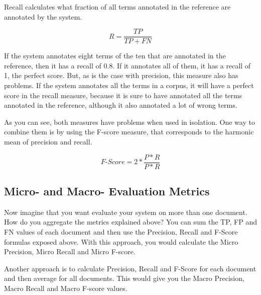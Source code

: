 Recall calculates what fraction of all terms annotated in the reference are annotated by the system.

\begin{equation}
R = \frac{TP}{TP+FN}
\end{equation}

If the system annotates eight terms of the ten that are annotated in the reference, then it has a recall of 0.8. If it annotates all of them, it has a recall of 1, the perfect score. But, as is the case with precision, this measure also has problems. If the system annotates all the terms in a corpus, it will have a perfect score in the recall measure, because it is sure to have annotated all the terms annotated in the reference, although it also annotated a lot of wrong terms.

As you can see, both measures have problems when used in isolation. One way to combine them is by using the F-score measure, that corresponds to the harmonic mean of precision and recall.

\begin{equation}
\textit{F-Score} = 2 * \frac{P*R}{P*R}
\end{equation}

\subsection{Micro- and Macro- Evaluation Metrics}

Now imagine that you want evaluate your system on more than one document. How do you aggregate the metrics explained above? You can sum the TP, FP and FN values of each document and then use the Precision, Recall and F-Score formulas exposed above. With this approach, you would calculate the Micro Precision, Micro Recall and Micro F-score.

Another approach is to calculate Precision, Recall and F-Score for each document and then average for all documents. This would give you the Macro Precision, Macro Recall and Macro F-score values.


